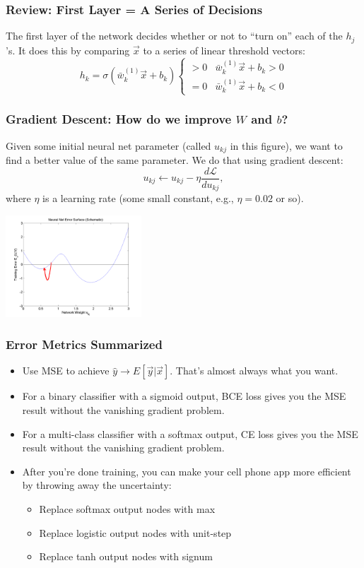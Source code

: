 \documentclass{beamer}
\begin{document}
\begin{frame}
  \frametitle{Review: First Layer = A Series of Decisions}

  The first layer of the network decides whether or not to ``turn on'' each of the
  $h_j$'s.  It does this by comparing $\vec{x}$ to a series of linear threshold vectors:
  \[
  h_k = \sigma\left(\bar{w}_k^{(1)}\vec{x}+b_k\right)\begin{cases}
  >0 & \bar{w}_k^{(1)}\vec{x} +b_k > 0\\
  =0 & \bar{w}_k^{(1)}\vec{x} +b_k < 0
  \end{cases}
  \]
\end{frame}

\begin{frame}
  \frametitle{Gradient Descent: How do we improve $W$ and $b$?}  Given
  some initial neural net parameter (called $u_{kj}$ in this figure),
  we want to find a better value of the same parameter.  We do that
  using gradient descent:
  \[
  u_{kj} \leftarrow u_{kj}-\eta\frac{d{\mathcal L}}{du_{kj}},
  \]
  where $\eta$ is a learning rate (some small constant, e.g., $\eta=0.02$ or so).
  \centerline{\includegraphics[width=2in]{../lec07/figs/nn_errorsurf1.png}}
\end{frame}

\begin{frame}
  \frametitle{Error Metrics Summarized}
  \begin{itemize}
    \item Use MSE to achieve $\hat{y}\rightarrow
      E\left[\vec{y}|\vec{x}\right]$.  That's almost always what you
      want.
    \item For a binary classifier with a sigmoid output, BCE loss gives you
      the MSE result without the vanishing gradient problem.
    \item For a multi-class classifier with a softmax output, CE loss gives you
      the MSE result without the vanishing gradient problem.
    \item After you're done training, you can make your cell phone app
      more efficient by throwing away the uncertainty:
      \begin{itemize}
      \item Replace softmax output nodes with max
      \item Replace logistic output nodes with unit-step
      \item Replace tanh output nodes with signum
      \end{itemize}
  \end{itemize}
\end{frame}
\end{document}
